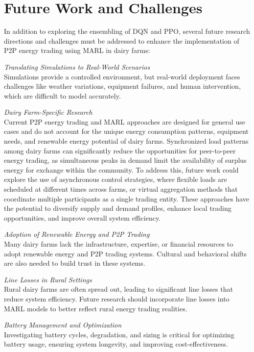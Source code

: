 \documentclass[preprint,12pt]{elsarticle}
\begin{document}
\section{Future Work and Challenges}
In addition to exploring the ensembling of DQN and PPO, several future research directions and challenges must be addressed to enhance the implementation of P2P energy trading using MARL in dairy farms:

\textit{Translating Simulations to Real-World Scenarios}\\
Simulations provide a controlled environment, but real-world deployment faces challenges like weather variations, equipment failures, and human intervention, which are difficult to model accurately.

\textit{Dairy Farm-Specific Research}\\
Current P2P energy trading and MARL approaches are designed for general use cases and do not account for the unique energy consumption patterns, equipment needs, and renewable energy potential of dairy farms. Synchronized load patterns among dairy farms can significantly reduce the opportunities for peer-to-peer energy trading, as simultaneous peaks in demand limit the availability of surplus energy for exchange within the community. To address this, future work could explore the use of asynchronous control strategies, where flexible loads are scheduled at different times across farms, or virtual aggregation methods that coordinate multiple participants as a single trading entity. These approaches have the potential to diversify supply and demand profiles, enhance local trading opportunities, and improve overall system efficiency.

\textit{Adoption of Renewable Energy and P2P Trading}\\
Many dairy farms lack the infrastructure, expertise, or financial resources to adopt renewable energy and P2P trading systems. Cultural and behavioral shifts are also needed to build trust in these systems.

\textit{Line Losses in Rural Settings}\\
Rural dairy farms are often spread out, leading to significant line losses that reduce system efficiency. Future research should incorporate line losses into MARL models to better reflect rural energy trading realities.

\textit{Battery Management and Optimization}\\
Investigating battery cycles, degradation, and sizing is critical for optimizing battery usage, ensuring system longevity, and improving cost-effectiveness.
\end{document}
